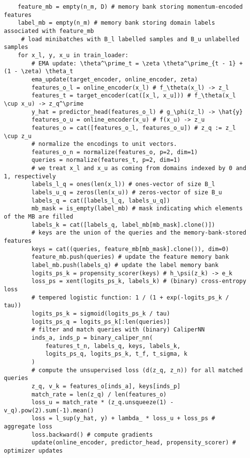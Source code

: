 \begin{algorithm}[ht]
\begin{verbatim}
    feature_mb = empty(n_m, D) # memory bank storing momentum-encoded features
    label_mb = empty(n_m) # memory bank storing domain labels associated with feature_mb
     # load minibatches with B_l labelled samples and B_u unlabelled samples
    for x_l, y, x_u in train_loader:
        # EMA update: \theta^\prime_t = \zeta \theta^\prime_{t - 1} + (1 - \zeta) \theta_t
        ema_update(target_encoder, online_encoder, zeta)
        features_o_l = online_encoder(x_l) # f_\theta(x_l) -> z_l
        features_t = target_encoder(cat([x_l, x_u])) # f_\theta(x_l \cup x_u) -> z_q^\prime
        y_hat = predictor_head(features_o_l) # g_\phi(z_l) -> \hat{y}
        features_o_u = online_encoder(x_u) # f(x_u) -> z_u
        features_o = cat([features_o_l, features_o_u]) # z_q := z_l \cup z_u
        # normalize the encodings to unit vectors.
        features_o_n = normalize(features_o, p=2, dim=1)
        queries = normalize(features_t, p=2, dim=1)
        # we treat x_l and x_u as coming from domains indexed by 0 and 1, respectively
        labels_l_q = ones(len(x_l)) # ones-vector of size B_l
        labels_u_q = zeros(len(x_u)) # zeros-vector of size B_u
        labels_q = cat([labels_l_q, labels_u_q])
        mb_mask = is_empty(label_mb) # mask indicating which elements of the MB are filled
        labels_k = cat([labels_q, label_mb[mb_mask].clone()])
        # keys are the union of the queries and the memory-bank-stored features
        keys = cat((queries, feature_mb[mb_mask].clone()), dim=0)
        feature_mb.push(queries) # update the feature memory bank
        label_mb.push(labels_q) # update the label memory bank
        logits_ps_k = propensity_scorer(keys) # h_\psi(z_k) -> e_k
        loss_ps = xent(logits_ps_k, labels_k) # (binary) cross-entropy loss
        # tempered logistic function: 1 / (1 + exp(-logits_ps_k / tau))
        logits_ps_k = sigmoid(logits_ps_k / tau) 
        logits_ps_q = logits_ps_k[:len(queries)]
        # filter and match queries with (binary) CaliperNN
        inds_a, inds_p = binary_caliper_nn(
            features_t_n, labels_q, keys, labels_k,
            logits_ps_q, logits_ps_k, t_f, t_sigma, k
        )
        # compute the unsupervised loss (d(z_q, z_n)) for all matched queries
        z_q, v_k = features_o[inds_a], keys[inds_p]
        match_rate = len(z_q) / len(features_o)
        loss_u = match_rate * (z_q.unsqueeze(1) - v_q).pow(2).sum(-1).mean()
        loss = l_sup(y_hat, y) + lambda_ * loss_u + loss_ps # aggregate loss
        loss.backward() # compute gradients
        update(online_encoder, predictor_head, propensity_scorer) # optimizer updates

    \end{verbatim}
\end{algorithm}
